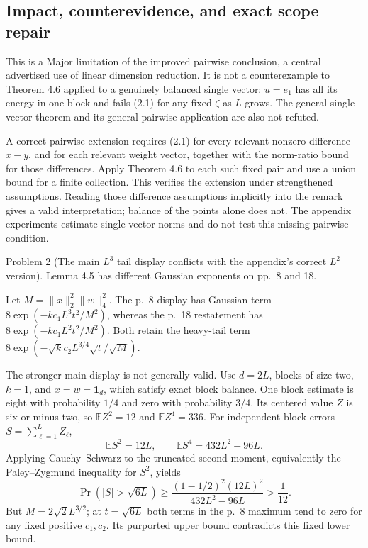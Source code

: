 \documentclass[10pt]{article}
\begin{document}
\subsection*{Impact, counterevidence, and exact scope repair}
This is a Major limitation of the improved pairwise conclusion, a central advertised use of linear dimension reduction. It is not a counterexample to Theorem 4.6 applied to a genuinely balanced single vector: \(u=e_1\) has all its energy in one block and fails (2.1) for any fixed \(\zeta\) as \(L\) grows. The general single-vector theorem and its general pairwise application are also not refuted.\par
A correct pairwise extension requires (2.1) for every relevant nonzero difference \(x-y\), and for each relevant weight vector, together with the norm-ratio bound for those differences. Apply Theorem 4.6 to each such fixed pair and use a union bound for a finite collection. This verifies the extension under strengthened assumptions. Reading those difference assumptions implicitly into the remark gives a valid interpretation; balance of the points alone does not. The appendix experiments estimate single-vector norms and do not test this missing pairwise condition.\par
Problem 2 (The main \(L^3\) tail display conflicts with the appendix’s correct \(L^2\) version).  Lemma 4.5 has different Gaussian exponents on pp. 8 and 18.\par
Let \(M=\|x\|_2^2\|w\|_4^2\). The p. 8 display has Gaussian term \(8\exp(-kc_1L^3t^2/M^2)\), whereas the p. 18 restatement has \(8\exp(-kc_1L^2t^2/M^2)\). Both retain the heavy-tail term \(8\exp(-\sqrt{k}c_2 L^{3/4}\sqrt t/\sqrt M)\).\par
The stronger main display is not generally valid. Use \(d=2L\), blocks of size two, \(k=1\), and \(x=w=\mathbf1_d\), which satisfy exact block balance. One block estimate is eight with probability \(1/4\) and zero with probability \(3/4\). Its centered value \(Z\) is six or minus two, so \(\mathbb EZ^2=12\) and \(\mathbb EZ^4=336\). For independent block errors \(S=\sum_{\ell=1}^L Z_\ell\), \[\mathbb ES^2=12L,\qquad \mathbb ES^4=432L^2-96L .\] Applying Cauchy–Schwarz to the truncated second moment, equivalently the Paley–Zygmund inequality for \(S^2\), yields \[\Pr(|S|>\sqrt{6L})\ge
 \frac{(1-1/2)^2(12L)^2}{432L^2-96L}>\frac1{12}.\] But \(M=2\sqrt2L^{3/2}\); at \(t=\sqrt{6L}\) both terms in the p. 8 maximum tend to zero for any fixed positive \(c_1,c_2\). Its purported upper bound contradicts this fixed lower bound.\par
\end{document}
